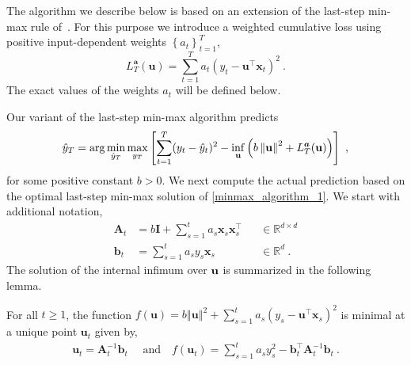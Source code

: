 The algorithm we describe below is based on an extension of the last-step min-max rule of~\cite{Forster}.
For this purpose we introduce a weighted cumulative loss using
positive input-dependent weights $\left\{ a_{t}\right\} _{t=1}^{T}$,
\[
L_{T}^{\boldsymbol{a}}(\mathbf{u})=\sum_{t=1}^{T}a_{t}\left(y_{t}-\mathbf{u}^{\top}\mathbf{x}_{t}\right)^{2}
~.
\]
The exact values of the weights $a_t$ will be defined below.

Our variant of the last-step min-max algorithm predicts
\begin{align}
\hat{y}_{T} = \arg\min_{\hat{y}_{T}} \max_{y_{T}} \left[{\sum_{t=1}^{T} (y_{t} -
  \hat{y}_{t})^2  - \inf_{\mathbf{u}} \left({b\left\Vert \mathbf{u}\right\Vert
    ^{2}+L_{T}^{\boldsymbol{a}}(\mathbf{u})}\right)}\right]~,
\label{minmax_algorithm_1}
\end{align}
for some positive constant $b>0$.
We next compute the actual prediction based on the optimal last-step min-max solution of \eqref{minmax_algorithm_1}. We
start with additional notation,
\begin{align}
\mathbf{A}_{t}
&=b\mathbf{I}+\sum_{s=1}^{t}a_{s}\mathbf{x}_{s}\mathbf{x}_{s}^{\top}&&\in\mathbb{R}^{d\times
  d}\label{Adef}\\
\mathbf{b}_{t}&=\sum_{s=1}^{t}a_{s}y_{s}\mathbf{x}_{s}&&\in\mathbb{R}^{d}\label{bdef} ~.
\end{align}
The solution of the internal infimum over $\mathbf{u}$ is summarized in the
following lemma.
\begin{lemma}
\label{lem:lemma1}
For all $t\geq1$, the function $f\left(\mathbf{u}\right)=b\left\Vert \mathbf{u}\right\Vert ^{2}+\sum_{s=1}^{t}a_{s}\left(y_{s}-\mathbf{u}^{\top}\mathbf{x}_{s}\right)^{2}$
is minimal at a unique point $\mathbf{u}_{t}$ given by,
\begin{align}
\mathbf{u}_{t}=\mathbf{A}_{t}^{-1}\mathbf{b}_{t}\quad\textrm{ and
}\quad
f(\mathbf{u}_{t})=\sum_{s=1}^{t}a_{s}y_{s}^{2}-\mathbf{b}_{t}^{\top}\mathbf{A}_{t}^{-1}\mathbf{b}_{t}
~. \label{optimal_solution}
\end{align}
\end{lemma}
